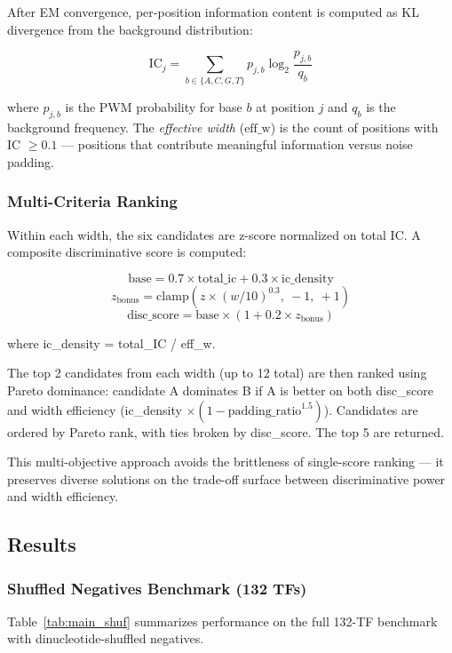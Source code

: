 \documentclass[11pt,a4paper]{article}
\begin{document}
After EM convergence, per-position information content is computed as KL divergence from the background distribution:

\[
\text{IC}_j = \sum_{b \in \{A,C,G,T\}} p_{j,b} \log_2 \frac{p_{j,b}}{q_b}
\]

where $p_{j,b}$ is the PWM probability for base $b$ at position $j$ and $q_b$ is the background frequency. The \emph{effective width} ($\text{eff\_w}$) is the count of positions with IC $\geq 0.1$ --- positions that contribute meaningful information versus noise padding.

\subsubsection{Multi-Criteria Ranking}

Within each width, the six candidates are z-score normalized on total IC. A composite discriminative score is computed:

\[
\text{base} = 0.7 \times \text{total\_ic} + 0.3 \times \text{ic\_density}
\]
\[
z_{\text{bonus}} = \text{clamp}\left(z \times (w/10)^{0.3},\ -1,\ +1\right)
\]
\[
\text{disc\_score} = \text{base} \times (1 + 0.2 \times z_{\text{bonus}})
\]

where ic\_density = total\_IC / eff\_w.

The top 2 candidates from each width (up to 12 total) are then ranked using Pareto dominance: candidate A dominates B if A is better on both disc\_score and width efficiency (ic\_density $\times (1 - \text{padding\_ratio}^{1.5})$). Candidates are ordered by Pareto rank, with ties broken by disc\_score. The top 5 are returned.

This multi-objective approach avoids the brittleness of single-score ranking --- it preserves diverse solutions on the trade-off surface between discriminative power and width efficiency.

\subsection{Results}
\label{sec:results}

\subsubsection{Shuffled Negatives Benchmark (132 TFs)}

Table~\ref{tab:main_shuf} summarizes performance on the full 132-TF benchmark with dinucleotide-shuffled negatives.
\end{document}

